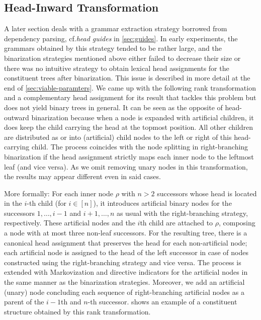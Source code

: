 \documentclass[../../document.tex]{subfiles}
\begin{document}
    \subsection{Head-Inward Transformation} \label{sec:extraction:bin:hi}
    A later section deals with a grammar extraction strategy borrowed from dependency parsing, cf.\@ \emph{head guides} in \cref{sec:guides}.
    In early experiments, the grammars obtained by this strategy tended to be rather large, and the binarization strategies mentioned above either failed to decrease their size or there was no intuitive strategy to obtain lexical head assignments for the constituent trees after binarization.
    This issue is described in more detail at the end of \cref{sec:viable-paramters}.
    We came up with the following rank transformation and a complementary head assignment for its result that tackles this problem but does not yield binary trees in general.
    It can be seen as the opposite of head-outward binarization because when a node is expanded with artificial children, it does keep the child carrying the head at the topmost position.
    All other children are distributed as or into (artificial) child nodes to the left or right of this head-carrying child.
    The process coincides with the node splitting in right-branching binarization if the head assignment strictly maps each inner node to the leftmost leaf (and vice versa).
    As we omit removing unary nodes in this transformation, the results may appear different even in said cases.

    More formally: For each inner node \(\rho\) with \(n > 2\) successors whose head is located in the \(i\)-th child (for \(i \in [n]\)), it introduces artificial binary nodes for the successors \(1, \ldots, i-1\) and \(i+1, \ldots, n\) as usual with the right-branching strategy, respectively.
    These artificial nodes and the \(i\)th child are attached to \(\rho\), composing a node with at most three non-leaf successors.
    For the resulting tree, there is a canonical head assignment that preserves the head for each non-artificial node; each artificial node is assigned to the head of the left successor in case of nodes constructed using the right-branching strategy and vice versa.
    The process is extended with Markovization and directive indicators for the artificial nodes in the same manner as the binarization strategies.
    Moreover, we add an artificial (unary) node concluding each sequence of right-branching artificial nodes as a parent of the \(i-1\)th and \(n\)-th successor.
     shows an example of a constituent structure obtained by this rank transformation.
\end{document}
